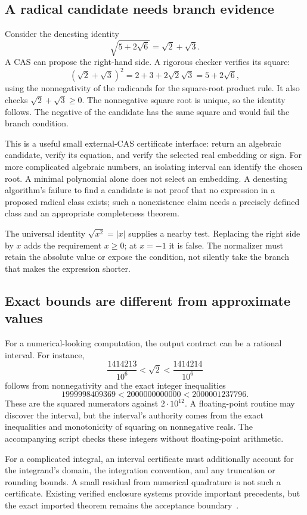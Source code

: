 \documentclass[11pt,a4paper]{article}
\theoremstyle{remark}
\begin{document}
\subsection{A radical candidate needs branch evidence}
Consider the denesting identity
\[
 \sqrt{5+2\sqrt6}=\sqrt2+\sqrt3.
\]
A CAS can propose the right-hand side. A rigorous checker verifies its square:
\[
 (\sqrt2+\sqrt3)^2=2+3+2\sqrt2\sqrt3=5+2\sqrt6,
\]
using the nonnegativity of the radicands for the square-root product rule. It
also checks $\sqrt2+\sqrt3\ge0$. The nonnegative square root is unique, so the
identity follows. The negative of the candidate has the same square and would
fail the branch condition.

This is a useful small external-CAS certificate interface: return an algebraic
candidate, verify its equation, and verify the selected real embedding or sign.
For more complicated algebraic numbers, an isolating interval can identify the
chosen root. A minimal polynomial alone does not select an embedding.
A denesting algorithm's failure to find a candidate is not proof that no
expression in a proposed radical class exists; such a nonexistence claim needs
a precisely defined class and an appropriate completeness theorem.

The universal identity $\sqrt{x^2}=|x|$ supplies a nearby test. Replacing the right
side by $x$ adds the requirement $x\ge0$; at $x=-1$ it is false. The normalizer
must retain the absolute value or expose the condition, not silently take the
branch that makes the expression shorter.

\subsection{Exact bounds are different from approximate values}
For a numerical-looking computation, the output contract can be a rational
interval. For instance,
\[
 \frac{1414213}{10^6}<\sqrt2<\frac{1414214}{10^6}
\]
follows from nonnegativity and the exact integer inequalities
\[
 1999998409369 < 2000000000000 < 2000001237796.
\]
These are the squared numerators against $2\cdot10^{12}$. A floating-point
routine may discover the interval, but the interval's authority comes from the
exact inequalities and monotonicity of squaring on nonnegative reals.
The accompanying script checks these integers without floating-point arithmetic.

For a complicated integral, an interval certificate must additionally account
for the integrand's domain, the integration convention, and any truncation or
rounding bounds. A small residual from numerical quadrature is not such a
certificate. Existing verified enclosure systems provide important precedents,
but the exact imported theorem remains the acceptance boundary~\cite{interval}.
\end{document}
